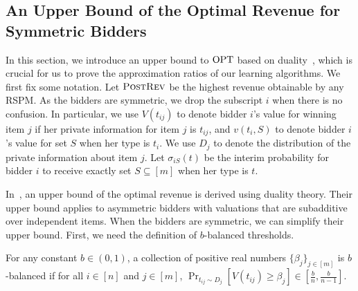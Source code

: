\subsection{An Upper Bound of the Optimal Revenue for Symmetric Bidders}\label{sec:UB symmetric}
In this section, we introduce an upper bound to $\text{OPT}$ based on duality~\cite{CaiZ17}, which is crucial for us to prove the approximation ratios of our learning algorithms. 
We first fix some notation. Let $\textsc{PostRev}$ be the highest revenue obtainable by any RSPM. As the bidders are symmetric, we drop the subscript $i$ when there is no confusion. In particular, we use $V(t_{ij})$ to denote bidder $i$'s value for winning item $j$ if her private information for item $j$ is $t_{ij}$, and $v(t_i,S)$ to denote bidder $i$'s value for set $S$ when her type is $t_i$. We use $D_j$ to denote the distribution of the private information about item $j$. Let $\sigma_{iS}(t)$ be the interim probability for bidder $i$ to receive exactly set $S\subseteq [m]$ when her type is $t$. %

In~\cite{CaiZ17}, an upper bound of the optimal revenue is derived using duality theory. Their upper bound applies to asymmetric bidders with valuations that are subadditive over independent items. When the bidders are symmetric, we can simplify their upper bound. First, we need the definition of $b$-balanced thresholds.

\begin{definition}\label{def:b-balanced}
	For any constant $b\in (0,1)$, a collection of positive real numbers $\{\beta_j\}_{j\in[m]}$ is $b$-balanced if for all $i\in[n]$ and $j\in[m]$, $\Pr_{t_{ij}\sim D_j}\left [V(t_{ij})\geq \beta_j\right]\in[\frac{b}{n},\frac{b}{n-1}]$.
\end{definition}

